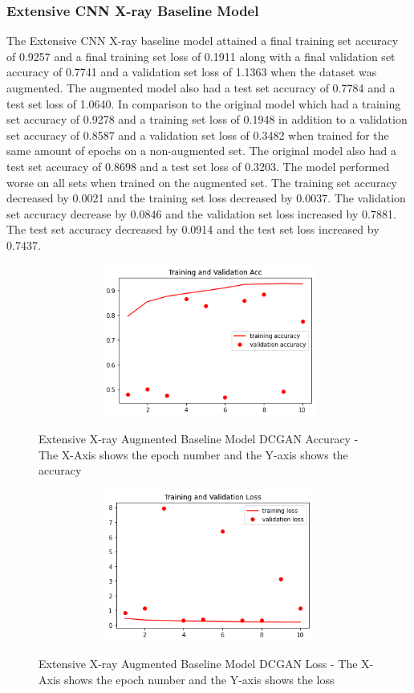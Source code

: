 \subsubsection{Extensive CNN X-ray Baseline Model}
The Extensive CNN X-ray baseline model attained a final training set accuracy of 0.9257 and a final training set loss of 0.1911 along with a final validation set accuracy of 0.7741 and a validation set loss of 1.1363 when the dataset was augmented. The augmented model also had a test set accuracy of 0.7784 and a test set loss of 1.0640.  In comparison to the original model which had a training set accuracy of 0.9278 and a training set loss of 0.1948 in addition to a validation set accuracy of 0.8587 and a validation set loss of 0.3482  when trained for the same amount of epochs on a non-augmented set.  The original model also had a test set accuracy of 0.8698 and a test set loss of 0.3203.  The model performed worse on all sets when trained on the augmented set.  The training set accuracy decreased by 0.0021 and the training set loss decreased by 0.0037. The validation set accuracy decrease by 0.0846 and the validation set loss increased by 0.7881.  The test set accuracy decreased by 0.0914 and the test set loss increased by 0.7437.
 \begin{figure}[H]
    \centering    \includegraphics[width=1\textwidth,height=5cm,keepaspectratio]{Images/BaselineTrainingValidationAccuracyExtensiveXRayAugmentedDCGAN.png}\\
    \caption{Extensive X-ray Augmented Baseline Model DCGAN Accuracy - The X-Axis shows the epoch number and the Y-axis shows the accuracy}
    \label{fig:Extensive X-ray Augmented Baseline Model DCGAN Accuracy}
\end{figure}
 \begin{figure}[H]
    \centering
    \includegraphics[width=1\textwidth,height=5cm,keepaspectratio]{Images/BaselineTrainingValidationLossExtensiveXRayAugmentedDCGAN.png}\\
    \caption{Extensive X-ray Augmented Baseline Model DCGAN Loss - The X-Axis shows the epoch number and the Y-axis shows the loss}
    \label{fig:Extensive X-ray Baseline Model DCGAN Loss}
\end{figure}
